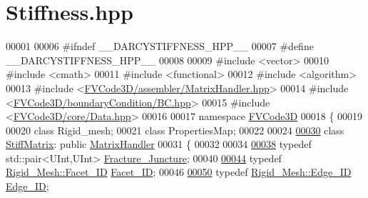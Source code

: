 \hypertarget{Stiffness_8hpp_source}{}\section{Stiffness.\+hpp}
\label{Stiffness_8hpp_source}

\begin{DoxyCode}
00001 
00006 \textcolor{preprocessor}{#ifndef \_\_DARCYSTIFFNESS\_HPP\_\_}
00007 \textcolor{preprocessor}{#define \_\_DARCYSTIFFNESS\_HPP\_\_}
00008 
00009 \textcolor{preprocessor}{#include <vector>}
00010 \textcolor{preprocessor}{#include <cmath>}
00011 \textcolor{preprocessor}{#include <functional>}
00012 \textcolor{preprocessor}{#include <algorithm>}
00013 \textcolor{preprocessor}{#include <\hyperlink{MatrixHandler_8hpp}{FVCode3D/assembler/MatrixHandler.hpp}>}
00014 \textcolor{preprocessor}{#include <\hyperlink{BC_8hpp}{FVCode3D/boundaryCondition/BC.hpp}>}
00015 \textcolor{preprocessor}{#include <\hyperlink{Data_8hpp}{FVCode3D/core/Data.hpp}>}
00016 
00017 \textcolor{keyword}{namespace }\hyperlink{namespaceFVCode3D}{FVCode3D}
00018 \{
00019 
00020 \textcolor{keyword}{class }Rigid\_mesh;
00021 \textcolor{keyword}{class }PropertiesMap;
00022 
00024 
\hypertarget{Stiffness_8hpp_source.tex_l00030}{}\hyperlink{classFVCode3D_1_1StiffMatrix}{00030} \textcolor{keyword}{class }\hyperlink{classFVCode3D_1_1StiffMatrix}{StiffMatrix}: \textcolor{keyword}{public} \hyperlink{classFVCode3D_1_1MatrixHandler}{MatrixHandler}
00031 \{
00032 
00034 
\hypertarget{Stiffness_8hpp_source.tex_l00038}{}\hyperlink{classFVCode3D_1_1StiffMatrix_ab6572f8976a3d7fc0d54d73888764252}{00038}     \textcolor{keyword}{typedef} std::pair<UInt,UInt> \hyperlink{classFVCode3D_1_1StiffMatrix_ab6572f8976a3d7fc0d54d73888764252}{Fracture\_Juncture};
00040 
\hypertarget{Stiffness_8hpp_source.tex_l00044}{}\hyperlink{classFVCode3D_1_1StiffMatrix_a317efdb4e4f2da856c747d1e0b80db20}{00044}     \textcolor{keyword}{typedef} \hyperlink{classFVCode3D_1_1Rigid__Mesh_1_1Facet__ID}{Rigid\_Mesh::Facet\_ID} \hyperlink{classFVCode3D_1_1StiffMatrix_a317efdb4e4f2da856c747d1e0b80db20}{Facet\_ID};
00046 
\hypertarget{Stiffness_8hpp_source.tex_l00050}{}\hyperlink{classFVCode3D_1_1StiffMatrix_ac82be26370aa6eb17714078d9a2bf8df}{00050}     \textcolor{keyword}{typedef} \hyperlink{classFVCode3D_1_1Rigid__Mesh_1_1Edge__ID}{Rigid\_Mesh::Edge\_ID} \hyperlink{classFVCode3D_1_1StiffMatrix_ac82be26370aa6eb17714078d9a2bf8df}{Edge\_ID};

\end{DoxyCode}
